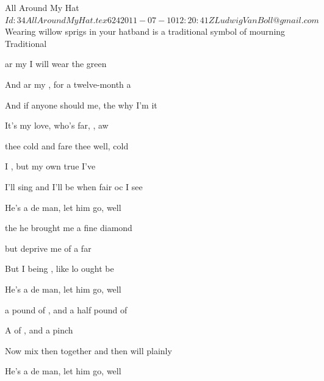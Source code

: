 \begin{SBSong}{All Around My Hat}
  {$Id: 34AllAroundMyHat.tex 624 2011-07-10 12:20:41Z LudwigVanBoll@gmail.com $}
  {Wearing willow sprigs in your hatband is a traditional symbol of mourning}
  {Traditional}
  \begin{SBChorus}
 	 ar my  I will wear the green 
 	
 	And  ar my , for a twelve-month  a 

 	And if anyone should  me, the  why I'm  it 
 	
    It's   my  love, who's far, , aw 
  \end{SBChorus}
  \begin{SBVerse}
 	 thee  cold  and fare thee well, cold 

 	  I , but my own true  I've 

 	I'll sing and I'll be  when fair oc I  see 

 	He's a  de  man, let him go, well 
  \end{SBVerse}
  \begin{SBVerse}
 	 the   he brought me a fine diamond 
 	
 	but    deprive me of a far  
 	
 	But I being , like lo ought  be 
 	
 	He's a  de  man, let him go, well 
  \end{SBVerse}
  \begin{SBVerse}
     a  pound of , and a half pound of 
    
    A   of , and a pinch  
    
    Now mix then  together and then  will plainly  
    
    He's a  de  man, let him go, well 
  \end{SBVerse}
\end{SBSong}
